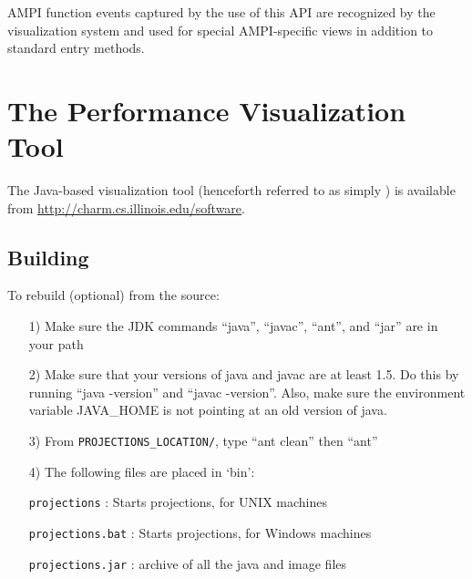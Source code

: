 \documentclass[10pt]{report}
\begin{document}
AMPI function events captured by the use of this API are recognized by
the visualization system and used for special AMPI-specific views in
addition to standard \charmpp{} entry methods.

%
%

\newpage

\chapter{The \projections{} Performance Visualization Tool}
\label{sec::visualization}

The \projections{} Java-based visualization tool (henceforth referred
to as simply \projections{}) is available from \url{http://charm.cs.illinois.edu/software}.

\section{Building \projections{}}

To rebuild \projections{} (optional) from the source:

\begin{enumerate}
\item[1)]
   Make sure the JDK commands ``java'', ``javac'', ``ant'',  and ``jar''
   are in your path  
\item[2)]
   Make sure that your versions of java and javac are at least 1.5. Do this by running ``java -version'' and ``javac -version''. Also, make sure the environment variable JAVA\_HOME is not pointing at an old version of java.
\item[3)]
   From {\tt PROJECTIONS\_LOCATION/}, type ``ant clean'' then ``ant''
\item[4)]
   The following files are placed in `bin':

      {\tt projections}           : Starts projections, for UNIX machines

      {\tt projections.bat}       : Starts projections, for Windows machines

      {\tt projections.jar}       : archive of all the java and image files
\end{enumerate}
\end{document}
